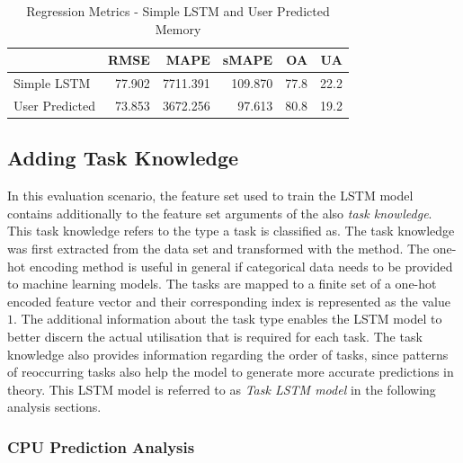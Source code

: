       \begin{table}
        \centering
        \caption{Regression Metrics - Simple LSTM and User Predicted Memory}
        \label{tab:regression-metrics-simple-lstm-user-predicted-memory}

        \begin{tabular}{|l|rrrrr|}
          \toprule
          {} &    RMSE &      MAPE &    sMAPE &    OA &    UA \\
          \midrule
          Simple LSTM &  77.902 &  7711.391 &  109.870 &  77.8 &  22.2 \\
          User Predicted  &  73.853 &  3672.256 &   97.613 &  80.8 &  19.2 \\
          \bottomrule
        \end{tabular}
      \end{table}

  \subsection{Adding Task Knowledge}
  \label{sec:adding-task-knowledge-evaluation-scenarios}

    In this evaluation scenario, the feature set used to train the LSTM model contains additionally to the feature set arguments of the  also \emph{task knowledge}. This task knowledge refers to the type a task is classified as. The task knowledge was first extracted from the data set and transformed with the  method. 
    The one-hot encoding method is useful in general if categorical data needs to be provided to machine learning models.
    The tasks are mapped to a finite set of a one-hot encoded feature vector and their corresponding index is represented as the value $1$.
    The additional information about the task type enables the LSTM model to better discern the actual utilisation that is required for each task.
    The task knowledge also provides information regarding the order of tasks, since patterns of reoccurring tasks also help the model to generate more accurate predictions in theory.
    This LSTM model is referred to as \emph{Task LSTM model} in the following analysis sections.    


    \subsubsection{CPU Prediction Analysis}
    \label{sec:cpu-prediction-analysis-task-knowledge-lstm-evaluation}

